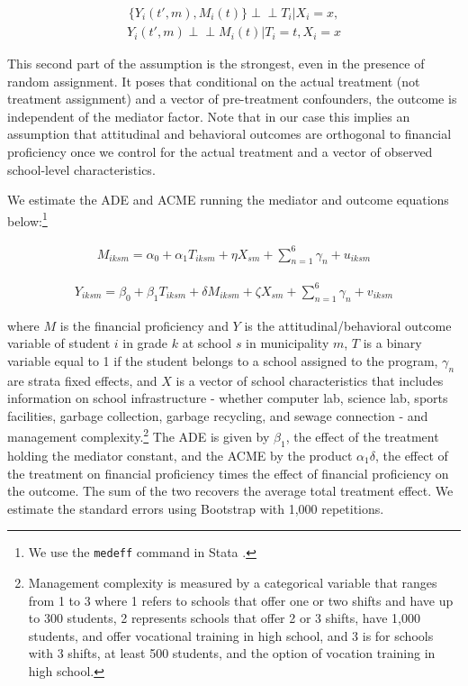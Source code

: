 \documentclass[
	12pt,				%
	oneside,			%
	a4paper,			%
	]{article}
\begin{document}
\begin{align} 
\{Y_i(t', m), M_i(t)\} \perp \!\!\! \perp T_i | X_i = x, 
\end {align}
\begin{align} 
Y_i(t',m) \perp \!\!\! \perp M_i(t) | T_i =t, X_i = x  
\end {align}


This second part of the assumption is the strongest, even in the presence of random assignment. It poses that conditional on the actual treatment (not treatment assignment) and a vector of pre-treatment confounders, the outcome is independent of the mediator factor. Note that in our case this implies an assumption that attitudinal and behavioral outcomes are orthogonal to financial proficiency once we control for the actual treatment and a vector of observed school-level characteristics. 

We estimate the ADE and ACME running the mediator and outcome equations below:\footnote{We use the \texttt{medeff} command in Stata \citep{hicks2011causal}.}

\begin{align}
     M_{iksm}= \alpha_0 + \alpha_1 T_{iksm} + \eta X_{sm} + \sum_{n=1}^{6} \gamma_n + u_{iksm}
     \label{eq:oa_med}
\end {align}

\begin{align}
     Y_{iksm}= \beta_0 + \beta_1 T_{iksm} + \delta M_{iksm} + \zeta X_{sm} + \sum_{n=1}^{6} \gamma_n + v_{iksm}
     \label{eq:oa_out}
\end {align}

\noindent
where $M$ is the financial proficiency and $Y$ is the attitudinal/behavioral outcome variable of student $i$ in grade $k$ at school $s$ in municipality $m$, $T$ is a binary variable equal to 1 if the student belongs to a school assigned to the program, $\gamma_n$ are strata fixed effects, and $X$ is a vector of school characteristics that includes information on school infrastructure - whether computer lab, science lab, sports facilities, garbage collection, garbage recycling, and sewage connection - and management complexity.\footnote{Management complexity is measured by a categorical variable that ranges from  1 to 3 where 1 refers to schools that offer one or two shifts and have up to 300 students, 2 represents schools that offer 2 or 3 shifts, have 1,000 students, and offer vocational training in high school, and 3 is for schools with 3 shifts, at least 500 students, and the option of vocation training in high school.} The ADE is given by $\beta_1$, the effect of the treatment holding the mediator constant, and the ACME by the product $\alpha_1 \delta$, the effect of the treatment on financial proficiency times the effect of financial proficiency on the outcome. The sum of the two recovers the average total treatment effect. We estimate the standard errors using Bootstrap with 1,000 repetitions.
\end{document}
